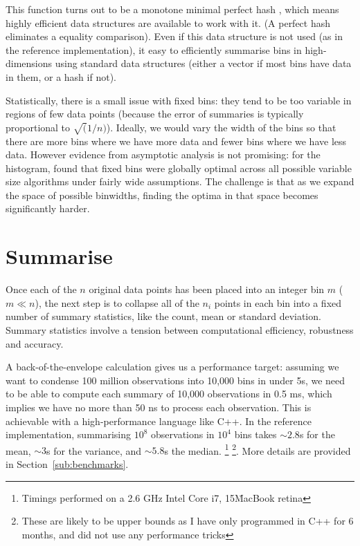 \documentclass[journal]{vgtc}                %
\begin{document}
This function turns out to be a monotone minimal perfect hash \citep{belazzougui:2009}, which means highly efficient data structures are available to work with it. (A perfect hash eliminates a equality comparison). Even if this data structure is not used (as in the reference implementation), it easy to efficiently summarise bins in high-dimensions using standard data structures (either a vector if most bins have data in them, or a hash if not).

Statistically, there is a small issue with fixed bins: they tend to be too variable in regions of few data points (because the error of summaries is typically proportional to $\sqrt(1/n)$). Ideally, we would vary the width of the bins so that there are more bins where we have more data and fewer bins where we have less data. However evidence from asymptotic analysis is not promising: for the histogram, \cite{kogure:1987} found that fixed bins were globally optimal across all possible variable size algorithms under fairly wide assumptions. The challenge is that as we expand the space of possible binwidths, finding the optima in that space becomes significantly harder. 



\section{Summarise}
\label{sec:summarise}

Once each of the $n$ original data points has been placed into an integer bin $m$ ($m \ll n$), the next step is to collapse all of the $n_i$ points in each bin into a fixed number of summary statistics, like the count, mean or standard deviation. Summary statistics involve a tension between computational efficiency, robustness and accuracy.

A back-of-the-envelope calculation gives us a performance target: assuming we want to condense 100 million observations into 10,000 bins in under 5s, we need to be able to compute each summary of 10,000 observations in 0.5 ms, which implies we have no more than 50 ns to process each observation. This is achievable with a high-performance language like C++. In the reference implementation, summarising $10^8$ observations in $10^4$ bins takes $\sim 2.8$s for the mean, $\sim 3$s for the variance, and $\sim 5.8$s the median. \footnote{Timings performed on a 2.6 GHz Intel Core i7, 15\" MacBook retina} \footnote{These are likely to be upper bounds as I have only programmed in C++ for 6 months, and did not use any performance tricks}.  More details are provided in Section~\ref{sub:benchmarks}.
\end{document}
